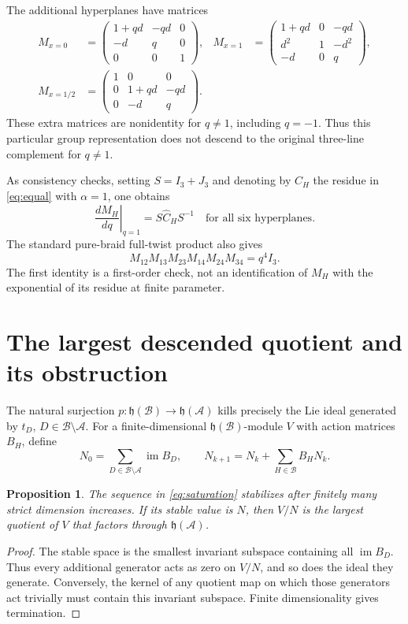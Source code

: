 \documentclass[11pt,a4paper]{article}
\newtheorem{proposition}[theorem]{Proposition}
\theoremstyle{remark}\newtheorem{remark}[theorem]{Remark}
\newcommand{\A}{\mathcal A}
\newcommand{\B}{\mathcal B}
\newcommand{\h}{\mathfrak h}
\newcommand{\im}{\operatorname{im}}
\begin{document}
The additional hyperplanes have matrices
\begin{align*}
M_{x=0}&=\begin{pmatrix}1+qd&-qd&0\\-d&q&0\\0&0&1\end{pmatrix},&
M_{x=1}&=\begin{pmatrix}1+qd&0&-qd\\d^2&1&-d^2\\-d&0&q\end{pmatrix},\\
M_{x=1/2}&=\begin{pmatrix}1&0&0\\0&1+qd&-qd\\0&-d&q\end{pmatrix}.&&
\end{align*}
These extra matrices are nonidentity for $q\ne1$, including $q=-1$.
Thus this particular group representation does not descend to the
original three-line complement for $q\ne1$.

As consistency checks, setting $S=I_3+J_3$ and denoting by $\widehat C_H$
the residue in \eqref{eq:equal} with $\alpha=1$, one obtains
\[
\left.\frac{dM_H}{dq}\right|_{q=1}=S\widehat C_HS^{-1}
\quad\text{for all six hyperplanes}.
\]
The standard pure-braid full-twist product also gives
\[
M_{12}M_{13}M_{23}M_{14}M_{24}M_{34}=q^4I_3.
\]
The first identity is a first-order check, not an identification of
$M_H$ with the exponential of its residue at finite parameter.

\section{The largest descended quotient and its obstruction}\label{sec:descent}
The natural surjection $p:\h(\B)\to\h(\A)$ kills precisely the Lie
ideal generated by $t_D$, $D\in\B\setminus\A$.  For a finite-dimensional
$\h(\B)$-module $V$ with action matrices $B_H$, define
\begin{equation}\label{eq:saturation}
N_0=\sum_{D\in\B\setminus\A}\im B_D,\qquad
N_{k+1}=N_k+\sum_{H\in\B}B_HN_k.
\end{equation}

\begin{proposition}\label{prop:descent}
The sequence in \eqref{eq:saturation} stabilizes after finitely many
strict dimension increases.  If its stable value is $N$, then $V/N$ is
the largest quotient of $V$ that factors through $\h(\A)$.
\end{proposition}
\begin{proof}
The stable space is the smallest invariant subspace containing all
$\im B_D$.  Thus every additional generator acts as zero on $V/N$, and
so does the ideal they generate.  Conversely, the kernel of any quotient
map on which those generators act trivially must contain this invariant
subspace.  Finite dimensionality gives termination.
\end{proof}
\end{document}
